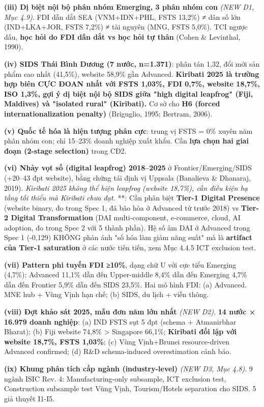 \documentclass[12pt,a4paper]{article}
\begin{document}
\textbf{(iii) Dị biệt nội bộ phân nhóm Emerging, 3 phân nhóm con}
\emph{(NEW D1, Mục 4.9)}. FDI dẫn dắt SEA (VNM+IDN+PHL, FSTS 13,2\%) ≠
dân số lớn (IND+LKA+JOR, FSTS 7,2\%) ≠ tài nguyên (MNG, FSTS 5,0\%). TCI
ngược dấu, \textbf{học hỏi do FDI dẫn dắt vs học hỏi tự thân} (Cohen \&
Levinthal, 1990).

\textbf{(iv) SIDS Thái Bình Dương (7 nước, n=1.371)}: phân tán 1,32, đổi
mới sản phẩm cao nhất (41,5\%), website 58,9\% gần Advanced.
\textbf{Kiribati 2025 là trường hợp biên CỰC ĐOAN nhất với FSTS 1,03\%,
FDI 0,7\%, website 18,7\%, ISO 1,3\%, gợi ý dị biệt nội bộ SIDS giữa
"high digital leapfrog" (Fiji, Maldives) và "isolated rural"
(Kiribati).} Cơ sở cho \textbf{H6 (forced internationalization penalty)}
(Briguglio, 1995; Bertram, 2006).

\textbf{(v) Quốc tế hóa là hiện tượng phân cực}: trung vị FSTS = 0\%
xuyên năm phân nhóm con; chỉ 15--23\% doanh nghiệp xuất khẩu. Cần
\textbf{lựa chọn hai giai đoạn (2-stage selection)} trong CĐ2.

\textbf{(vi) Nhảy vọt số (digital leapfrog) 2018--2025} ở
Frontier/Emerging/SIDS (+20--43 đpt website), bằng chứng tái định vị
Uppsala (Banalieva \& Dhanaraj, 2019). \emph{Kiribati 2025 không thể
hiện leapfrog (website 18,7\%), cần điều kiện hạ tầng tối thiểu mà
Kiribati chưa đạt.} **: Cần phân biệt \textbf{Tier-1 Digital Presence}
(website binary, đo trong Spec 1, đã bão hòa ở Advanced từ trước 2018)
vs \textbf{Tier-2 Digital Transformation} (DAI multi-component,
e-commerce, cloud, AI adoption, đo trong Spec 2 với 5 thành phần). Hệ số
âm DAI ở Advanced trong Spec 1 (-0,129) KHÔNG phản ánh "số hóa làm giảm
năng suất" mà là \textbf{artifact của Tier-1 saturation} ở các nước tiên
tiến, xem Mục 4.4.5 ICT exclusion test.

\textbf{(vii) Pattern phi tuyến FDI ≥10\%}, dạng chữ U với cực tiểu
Emerging (4,7\%): Advanced 11,1\% dẫn đến Upper-middle 8,4\% dẫn đến
Emerging 4,7\% dẫn đến Frontier 5,9\% dẫn đến SIDS 23,5\%. Hai mô hình
FDI: (a) Advanced. MNE hub + Vùng Vịnh hạn chế; (b) SIDS, du lịch + viễn
thông.

\textbf{(viii) Đợt khảo sát 2025, mẫu đơn năm lớn nhất} \emph{(NEW D2)}.
\textbf{14 nước × 16.979 doanh nghiệp}: (a) IND FSTS sụt 5 đpt (schema +
Atmanirbhar Bharat); (b) Fiji website 74,8\% \textgreater{} Singapore
66,1\%; \textbf{Kiribati đối lập với website 18,7\%, FSTS 1,03\%}; (c)
Vùng Vịnh+Brunei resource-driven Advanced confirmed; (d) R\&D
schema-induced overestimation cảnh báo.

\textbf{(ix) Khung phân tích cấp ngành (industry-level)} \emph{(NEW D3,
Mục 4.8)}. 9 ngành ISIC Rev. 4: Manufacturing-only subsample, ICT
exclusion test, Construction subsample test Vùng Vịnh, Tourism/Hotels
separation cho SIDS. 5 giả thuyết I1-I5.
\end{document}
